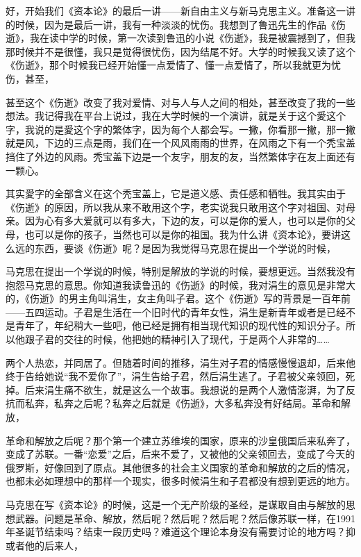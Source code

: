 \documentclass[UTF8, 12pt, a4paper]{ctexrep}
\begin{document}
好，开始我们《资本论》的最后一讲——新自由主义与新马克思主义。准备这一讲的时候，因为是最后一讲，我有一种淡淡的忧伤。我想到了鲁迅先生的作品《伤逝》，我在读中学的时候，第一次读到鲁迅的小说《伤逝》，我是被震撼到了，但我那时候并不是很懂，我只是觉得很忧伤，因为结尾不好。大学的时候我又读了这个《伤逝》，那个时候我已经开始懂一点爱情了、懂一点爱情了，所以我就更为忧伤，甚至，

甚至这个《伤逝》改变了我对爱情、对与人与人之间的相处，甚至改变了我的一些想法。我记得我在平台上说过，我在大学时候的一个演讲，就是关于这个愛这个字，我说的是愛这个字的繁体字，因为每个人都会写。一撇，你看那一撇，那一撇就是风，下边的三点是雨，我们在一个风风雨雨的世界，在风雨之下有一个秃宝盖挡住了外边的风雨。秃宝盖下边是一个友字，朋友的友，当然繁体字在友上面还有一颗心。

其实愛字的全部含义在这个秃宝盖上，它是道义感、责任感和牺牲。我其实由于《伤逝》的原因，所以我从来不敢用这个字，老实说我只敢用这个字对祖国、对母亲。因为心有多大爱就可以有多大，下边的友，可以是你的爱人，也可以是你的父母，也可以是你的孩子，当然也可以是你的祖国。我为什么讲《资本论》，要讲这么远的东西，要谈《伤逝》呢？是因为我觉得马克思在提出一个学说的时候，

马克思在提出一个学说的时候，特别是解放的学说的时候，要想更远。当然我没有抱怨马克思的意思。你知道我读鲁迅的《伤逝》的时候，我对涓生的意见是非常大的，《伤逝》的男主角叫涓生，女主角叫子君。这个《伤逝》写的背景是一百年前——五四运动。子君是生活在一个旧时代的青年女性，涓生是新青年或者是已经不是青年了，年纪稍大一些吧，他已经是拥有相当现代知识的现代性的知识分子。所以他跟子君的交往的时候，他把她的精神引入了现代，于是两个人非常的……

两个人热恋，并同居了。但随着时间的推移，涓生对子君的情感慢慢退却，后来他终于告给她说“我不爱你了”，涓生告给子君，然后涓生逃了。子君被父亲领回，死掉。后来涓生痛不欲生，就是这么一个故事。我想说的是两个人激情澎湃，为了反抗而私奔，私奔之后呢？私奔之后就是《伤逝》，大多私奔没有好结局。革命和解放，

革命和解放之后呢？那个第一个建立苏维埃的国家，原来的沙皇俄国后来私奔了，变成了苏联。一番“恋爱”之后，后来不爱了，又被他的父亲领回去，变成了今天的俄罗斯，好像回到了原点。其他很多的社会主义国家的革命和解放的之后的情况，也都未必如理想中的那样一个现实，很多时候涓生和子君都没有想到更远的地方。

马克思在写《资本论》的时候，这是一个无产阶级的圣经，是谋取自由与解放的思想武器。问题是革命、解放，然后呢？然后呢？然后呢？然后像苏联一样，在1991年圣诞节结束吗？结束一段历史吗？难道这个理论本身没有需要讨论的地方吗？抑或者他的后来人，
\end{document}
